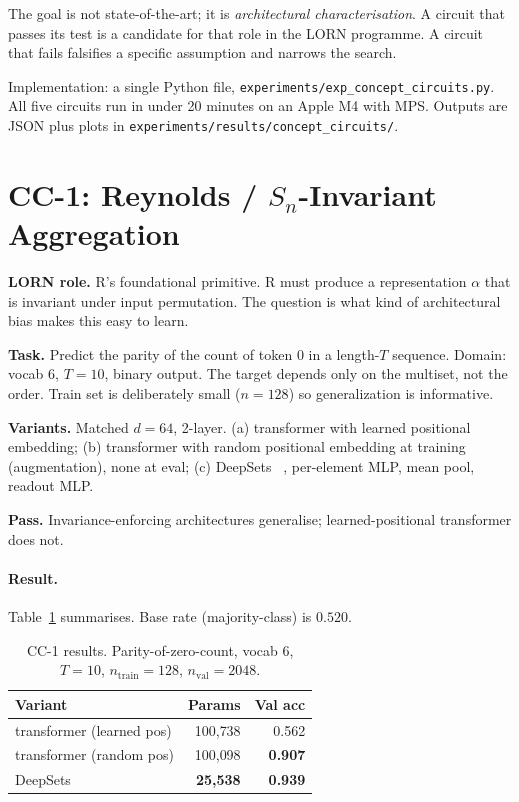 \documentclass[10pt, twocolumn, a4paper]{article}
\newcommand{\Sn}{S_n}
\begin{document}
The goal is not state-of-the-art; it is \emph{architectural characterisation}. A circuit that passes its test is a candidate for that role in the LORN programme. A circuit that fails falsifies a specific assumption and narrows the search.

Implementation: a single Python file, \texttt{experiments/exp\_concept\_circuits.py}. All five circuits run in under 20 minutes on an Apple M4 with MPS. Outputs are JSON plus plots in \texttt{experiments/results/concept\_circuits/}.

\section{CC-1: Reynolds / $\Sn$-Invariant Aggregation}

\textbf{LORN role.} R's foundational primitive. R must produce a representation $\alpha$ that is invariant under input permutation. The question is what kind of architectural bias makes this easy to learn.

\textbf{Task.} Predict the parity of the count of token $0$ in a length-$T$ sequence. Domain: vocab $6$, $T=10$, binary output. The target depends only on the multiset, not the order. Train set is deliberately small ($n=128$) so generalization is informative.

\textbf{Variants.} Matched $d=64$, 2-layer. (a) transformer with learned positional embedding; (b) transformer with random positional embedding at training (augmentation), none at eval; (c) DeepSets~\cite{zaheer2017deepsets} ,  per-element MLP, mean pool, readout MLP.

\textbf{Pass.} Invariance-enforcing architectures generalise; learned-positional transformer does not.

\paragraph{Result.} Table~\ref{tab:cc1} summarises. Base rate (majority-class) is $0.520$.

\begin{table}[t]
\centering\small
\caption{CC-1 results. Parity-of-zero-count, vocab 6, $T=10$, $n_{\mathrm{train}}=128$, $n_{\mathrm{val}}=2048$.}
\label{tab:cc1}
\begin{tabular}{lrr}
\toprule
Variant & Params & Val acc \\
\midrule
transformer (learned pos) & 100{,}738 & 0.562 \\
transformer (random pos)  & 100{,}098 & \textbf{0.907} \\
DeepSets                  & \textbf{25{,}538}  & \textbf{0.939} \\
\bottomrule
\end{tabular}
\end{table}
\end{document}
